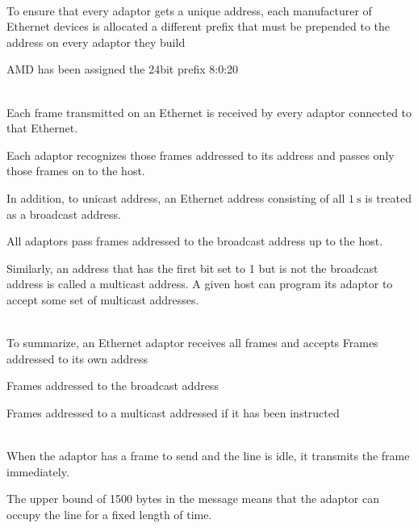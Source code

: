 \begin{description}
\os{\newpage}\item[{\rot\bf  Ethernet Addresses }]~\\[-3ex]

\bi
  \ite To ensure that every adaptor gets a unique address, each manufacturer of Ethernet devices is allocated a different prefix that must be prepended to the address on every adaptor they build
\ei

\bi
  \ite AMD has been assigned the 24bit prefix 8:0:20
\ei


\os{\newpage}\item[{\rot\bf  Ethernet Addresses }]~\\[-3ex]

\bi
  \ite Each frame transmitted on an Ethernet is received by every adaptor connected to that Ethernet.

  \ite Each adaptor recognizes those frames addressed to its address and passes only those frames on to the host.

  \ite In addition, to unicast address, an Ethernet address consisting of all $1 \mathrm{~s}$ is treated as a broadcast address.

\ei
\bi
 \ite All adaptors pass frames addressed to the broadcast address up to the host.
 \ei


\bi
  \ite Similarly, an address that has the first bit set to 1 but is not the broadcast address is called a multicast address.
\ei
\bi
 \ite A given host can program its adaptor to accept some set of multicast addresses.
 \ei



\os{\newpage}\item[{\rot\bf  Ethernet Addresses }]~\\[-3ex]

\bi
  \ite To summarize, an Ethernet adaptor receives all frames and accepts
\ei
\bi
 \ite Frames addressed to its own address
 \ei

\bi
 \ite Frames addressed to the broadcast address
 \ei

\bi
 \ite Frames addressed to a multicast addressed if it has been instructed
 \ei



\os{\newpage}\item[{\rot\bf  Ethernet Transmitter Algorithm }]~\\[-3ex]

\bi
  \ite When the adaptor has a frame to send and the line is idle, it transmits the frame immediately.

  \ite The upper bound of 1500 bytes in the message means that the adaptor can occupy the line for a fixed length of time.


\end{description}
